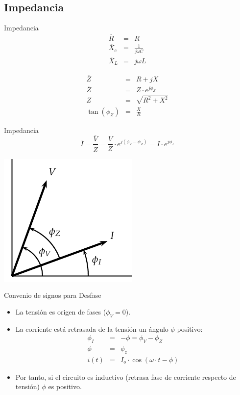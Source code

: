\documentclass[xcolor={usenames,svgnames,dvipsnames}]{beamer}
\begin{document}
\subsection{Impedancia}
\label{sec:orgacff3e8}
\begin{frame}[label={sec:orgb5f347c}]{Impedancia}
$$\begin{aligned}
  \overline{R} & = & R\\
  \overline{X}_{c} & = & \frac{1}{j\omega C}\\
  \overline{X}_{L} & = & j\omega L
\end{aligned}$$

$$\begin{aligned}
  \overline{Z} & = & R+jX\\
  \overline{Z} & = & Z\cdot e^{j\phi_{Z}}\\
  Z & = & \sqrt{R^{2}+X^{2}}\\
  \tan(\phi_{Z}) & = & \frac{X}{R}
\end{aligned}$$
\end{frame}

\begin{frame}[label={sec:org143106d}]{Impedancia}
$$\overline{I}=\frac{\overline{V}}{\overline{Z}}=\frac{V}{Z}\cdot
e^{j(\phi_{V}-\phi_{Z})}=I\cdot e^{j\phi_{I}}$$
\begin{center}
\includegraphics[height=0.4\textheight]{../figs/Impedancia.pdf}
\end{center}
\end{frame}

\begin{frame}[label={sec:org76e60a9}]{Convenio de signos para Desfase}
\begin{itemize}
\item La tensión es origen de fases (\(\phi_{V}=0\)).

\item La corriente está retrasada de la tensión un ángulo \(\phi\) positivo:
$$\begin{aligned}
         \phi_{I} & = & -\phi=\phi_{V}-\phi_{Z}\\
         \phi & = & \phi_{z}\\
         i(t) & = & I_{o}\cdot\cos(\omega\cdot t-\phi)
       \end{aligned}$$

\item Por tanto, \alert{si el circuito es inductivo (retrasa fase de corriente
respecto de tensión) \(\phi\) es positivo}.
\end{itemize}
\end{frame}
\end{document}
